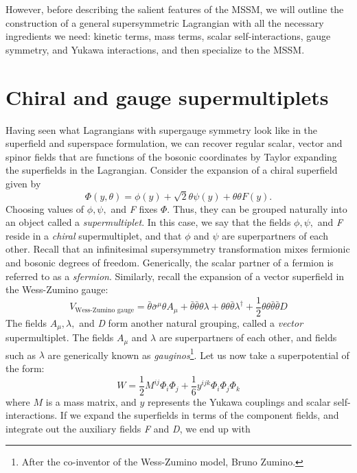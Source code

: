However, before describing the salient features of the MSSM, we will outline the construction of a general supersymmetric Lagrangian with all the necessary ingredients we need: kinetic terms, mass terms, scalar self-interactions, gauge symmetry, and Yukawa interactions, and then specialize to the MSSM.

\section{Chiral and gauge supermultiplets}
Having seen what Lagrangians with supergauge symmetry look like in the superfield and superspace formulation, we can recover regular scalar, vector and spinor fields that are functions of the bosonic coordinates by Taylor expanding the superfields in the Lagrangian. Consider the expansion of a chiral superfield given by
\[\Phi(y,\theta) = \phi(y) + \sqrt{2}\theta\psi(y)+\theta\theta F(y).\]
Choosing values of $\phi,\psi,$ and \emph{F} fixes $\Phi$. Thus, they can be grouped naturally into an object called a \emph{supermultiplet}. In this case, we say that the fields $\phi,\psi,$ and \emph{F} reside in a \emph{chiral} supermultiplet, and that $\phi$ and $\psi$ are superpartners of each other. Recall that an infinitesimal supersymmetry transformation mixes fermionic and bosonic degrees of freedom. Generically, the scalar partner of a fermion is referred to as a \emph{sfermion}. Similarly, recall the expansion of a vector superfield in the Wess-Zumino gauge:
\[V_\text{Wess-Zumino gauge} = \bar{\theta}\bar{\sigma}^\mu\theta A_\mu+\bar{\theta}\bar{\theta}\theta\lambda+\theta\theta\bar{\theta}\lambda^\dagger+\frac{1}{2}\theta\theta\bar{\theta}\bar{\theta}D\]
The fields $A_\mu,\lambda,$ and \emph{D} form another natural grouping, called a \emph{vector} supermultiplet. The fields $A_\mu$ and $\lambda$ are superpartners of each other, and fields such as $\lambda$ are generically known as \emph{gauginos}\footnote{After the co-inventor of the Wess-Zumino model, Bruno Zumino.}.
Let us now take a superpotential of the form:
\begin{equation}
W = \frac{1}{2}M^{ij}\Phi_i\Phi_j + \frac{1}{6}y^{ijk}\Phi_i\Phi_j\Phi_k
\label{eq:superpotential}
\end{equation}
where $M$ is a mass matrix, and $y$ represents the Yukawa couplings and scalar self-interactions.
If we expand the superfields in terms of the component fields, and integrate out the auxiliary fields \emph{F} and \emph{D}, we end up with

